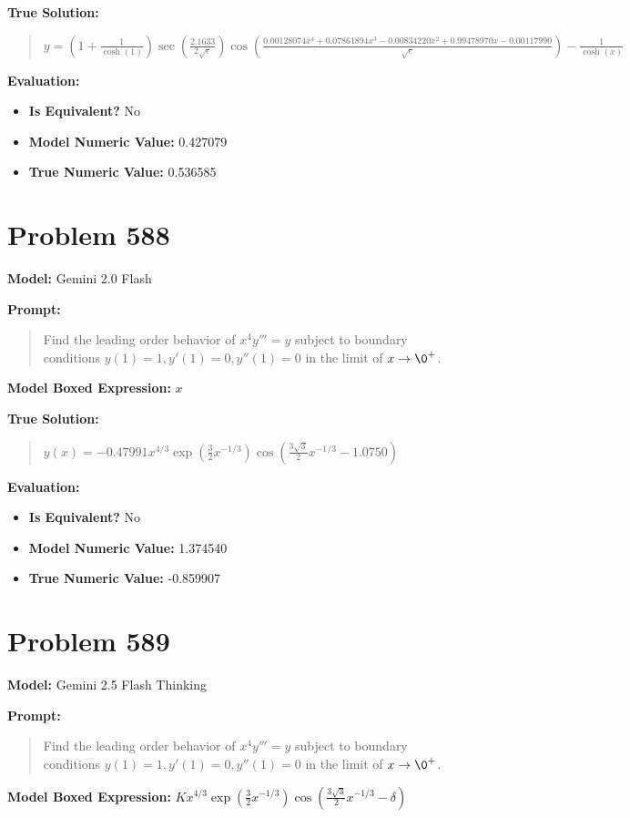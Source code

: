 \documentclass{article}
\begin{document}
\textbf{True Solution:}
\begin{quote}
$y = (1+\frac{1}{\cosh(1)}) \sec(\frac{2.1633}{2\sqrt{\epsilon}})\cos(\frac{0.00128074x^4 + 0.07861894x^3 - 0.00834220x^2 + 0.99478970x - 0.00117990}{\sqrt{\epsilon}})- \frac{1}{\cosh(x)}$
\end{quote}

\textbf{Evaluation:}
\begin{itemize}
\item \textbf{Is Equivalent?} No
\item \textbf{Model Numeric Value:} 0.427079
\item \textbf{True Numeric Value:} 0.536585
\end{itemize}
\vspace{1cm}
\section*{Problem 588}
\textbf{Model:} Gemini 2.0 Flash

\textbf{Prompt:}
\begin{quote}
Find the leading order behavior of $x^4y'''=y$ subject to boundary conditions $y(1)=1,y'(1)=0,y''(1)=0$ in the limit of $x\to\0^+$.
\end{quote}
\textbf{Model Boxed Expression:} $x$

\textbf{True Solution:}
\begin{quote}
$y(x) =-0.47991x^{4/3}\exp{\left( \frac{3}{2} x^{-1/3} \right)}\cos\left( \frac{3\sqrt{3}}{2} x^{-1/3} -1.0750 \right)$
\end{quote}

\textbf{Evaluation:}
\begin{itemize}
\item \textbf{Is Equivalent?} No
\item \textbf{Model Numeric Value:} 1.374540
\item \textbf{True Numeric Value:} -0.859907
\end{itemize}
\vspace{1cm}
\section*{Problem 589}
\textbf{Model:} Gemini 2.5 Flash Thinking

\textbf{Prompt:}
\begin{quote}
Find the leading order behavior of $x^4y'''=y$ subject to boundary conditions $y(1)=1,y'(1)=0,y''(1)=0$ in the limit of $x\to\0^+$.
\end{quote}
\textbf{Model Boxed Expression:} $K x^{4/3} \exp\left(\frac{3}{2}x^{-1/3}\right) \cos\left(\frac{3\sqrt{3}}{2}x^{-1/3} - \delta\right)$
\end{document}
